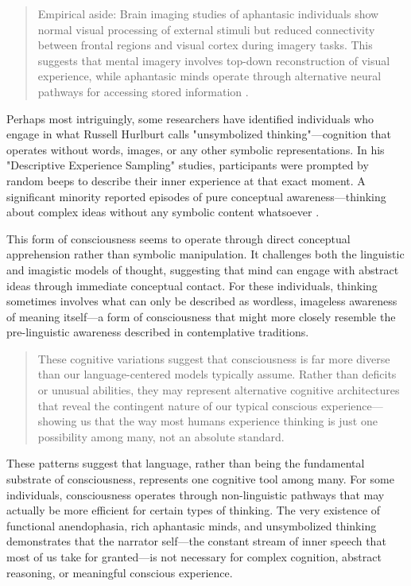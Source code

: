 \begin{quote}\small
Empirical aside: Brain imaging studies of aphantasic individuals show normal visual processing of external stimuli but reduced connectivity between frontal regions and visual cortex during imagery tasks. This suggests that mental imagery involves top-down reconstruction of visual experience, while aphantasic minds operate through alternative neural pathways for accessing stored information \parencite{zeman2020phantasia}.
\end{quote}

Perhaps most intriguingly, some researchers have identified individuals who engage in what Russell Hurlburt calls "unsymbolized thinking"—cognition that operates without words, images, or any other symbolic representations. In his "Descriptive Experience Sampling" studies, participants were prompted by random beeps to describe their inner experience at that exact moment. A significant minority reported episodes of pure conceptual awareness—thinking about complex ideas without any symbolic content whatsoever \parencite{hurlburt2011investigating}.

This form of consciousness seems to operate through direct conceptual apprehension rather than symbolic manipulation. It challenges both the linguistic and imagistic models of thought, suggesting that mind can engage with abstract ideas through immediate conceptual contact. For these individuals, thinking sometimes involves what can only be described as wordless, imageless awareness of meaning itself—a form of consciousness that might more closely resemble the pre-linguistic awareness described in contemplative traditions.

\begin{quote}\small
These cognitive variations suggest that consciousness is far more diverse than our language-centered models typically assume. Rather than deficits or unusual abilities, they may represent alternative cognitive architectures that reveal the contingent nature of our typical conscious experience—showing us that the way most humans experience thinking is just one possibility among many, not an absolute standard.
\end{quote}

These patterns suggest that language, rather than being the fundamental substrate of consciousness, represents one cognitive tool among many. For some individuals, consciousness operates through non-linguistic pathways that may actually be more efficient for certain types of thinking. The very existence of functional anendophasia, rich aphantasic minds, and unsymbolized thinking demonstrates that the narrator self—the constant stream of inner speech that most of us take for granted—is not necessary for complex cognition, abstract reasoning, or meaningful conscious experience.


